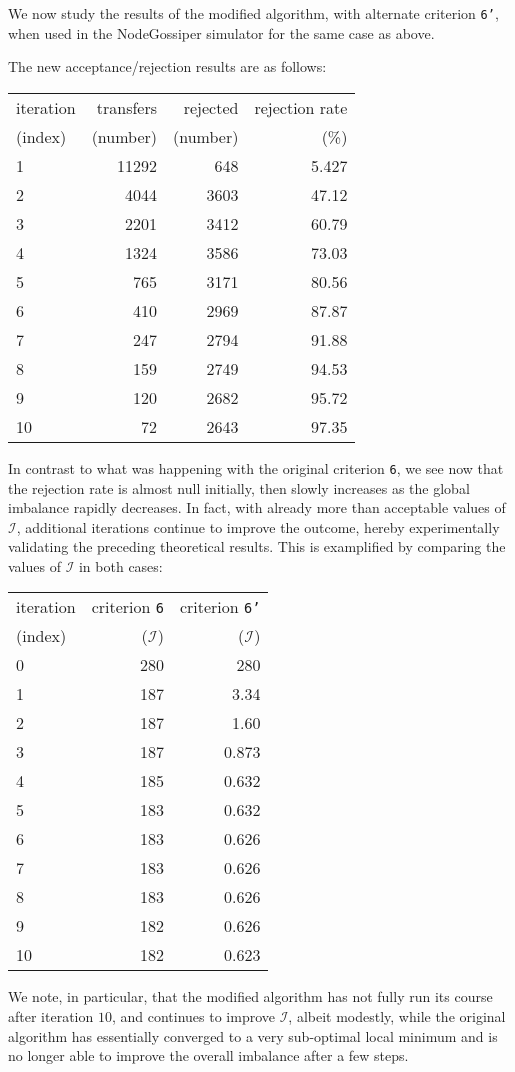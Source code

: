 We now study the results of the modified algorithm, with alternate
criterion \texttt{6'}, when used in the \textsf{NodeGossiper}
simulator for the same case as above.

The new acceptance/rejection results are as follows:
\begin{center}
\begin{tabular}{lrrr}
\hline
iteration & transfers & rejected & rejection rate\\
(index)   & (number)  & (number) & (\%)\\
\hline\hline
 1 & 11292 &  648 & 5.427\\
 2 &  4044 & 3603 & 47.12\\
 3 &  2201 & 3412 & 60.79\\
 4 &  1324 & 3586 & 73.03\\
 5 &   765 & 3171 & 80.56\\
 6 &   410 & 2969 & 87.87\\
 7 &   247 & 2794 & 91.88\\
 8 &   159 & 2749 & 94.53\\
 9 &   120 & 2682 & 95.72\\
10 &    72 & 2643 & 97.35\\
\hline
\end{tabular}
\end{center}

In contrast to what was happening with the original criterion
\texttt{6}, we see now that the rejection rate is almost null
initially, then slowly increases as the global imbalance rapidly decreases.
In fact, with already more than acceptable values of $\mathcal{I}$,
additional iterations continue to improve the outcome, hereby
experimentally validating the preceding theoretical results. This is
examplified by comparing the values of $\mathcal{I}$ in both cases:
\begin{center}
\begin{tabular}{lrr}
\hline
iteration & criterion \texttt{6}  & criterion \texttt{6'} \\
(index)   & ($\mathcal{I}$) & ($\mathcal{I}$) \\
\hline\hline
 0 & 280 &   280\\
 1 & 187 &  3.34\\
 2 & 187 &  1.60\\
 3 & 187 & 0.873\\
 4 & 185 & 0.632\\
 5 & 183 & 0.632 \\
 6 & 183 & 0.626 \\
 7 & 183 & 0.626 \\
 8 & 183 & 0.626 \\
 9 & 182 & 0.626 \\
10 & 182 & 0.623 \\
\hline
\end{tabular}
\end{center}
We note, in particular, that the modified algorithm has not fully run
its course after iteration $10$, and continues to improve
$\mathcal{I}$, albeit modestly, while the original algorithm has
essentially converged to a very sub-optimal local minimum and is no
longer able to improve the overall imbalance after a few steps.
